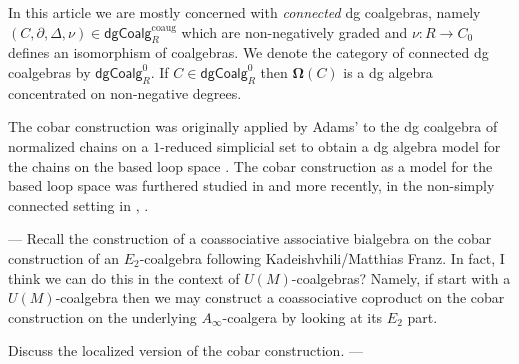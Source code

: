 In this article we are mostly concerned with \textit{connected} dg coalgebras, namely $(C, \partial, \Delta, \nu) \in \mathsf{dgCoalg}^{\text{coaug}}_R$ which are non-negatively graded and $\nu: R \to C_0$ defines an isomorphism of coalgebras. We denote the category of connected dg coalgebras by $\mathsf{dgCoalg}^0_R$. If $C \in \mathsf{dgCoalg}_R^0$ then $\mathbf{\Omega}(C)$ is a dg algebra concentrated on non-negative degrees. 

The cobar construction was originally applied by Adams' to the dg coalgebra of normalized chains on a $1$-reduced simplicial set to obtain a dg algebra model for the chains on the based loop space \cite{Adams}. The cobar construction as a model for the based loop space was furthered studied in \cite{Baues} and more recently, in the non-simply connected setting in \cite{Hess-Tonks}, \cite{Rivera-Zeinalian}.


--- Recall the construction of a coassociative associative bialgebra on the cobar construction of an $E_2$-coalgebra following Kadeishvhili/Matthias Franz. In fact, I think we can do this in the context of $U(M)$-coalgebras? Namely, if start with a $U(M)$-coalgebra then we may construct a coassociative coproduct on the cobar construction on the underlying $A_{\infty}$-coalgera by looking at its $E_2$ part.

Discuss the localized version of the cobar construction. ---
